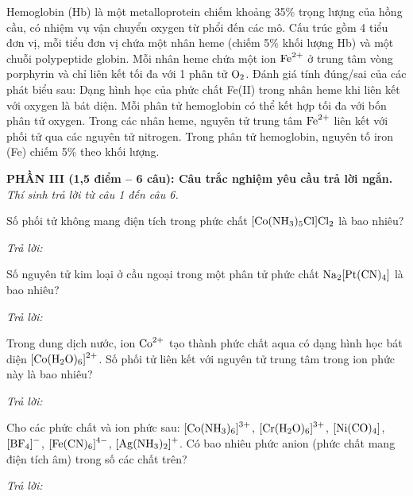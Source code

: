 \documentclass[11pt,a4paper]{article}
\def\loigiai#1{}
\begin{document}
\begin{ex}
Hemoglobin (Hb) là một metalloprotein chiếm khoảng 35\% trọng lượng của hồng cầu, có nhiệm vụ vận chuyển oxygen từ phổi đến các mô. Cấu trúc gồm 4 tiểu đơn vị, mỗi tiểu đơn vị chứa một nhân heme (chiếm 5\% khối lượng Hb) và một chuỗi polypeptide globin. Mỗi nhân heme chứa một ion $\ce{Fe^2+}$ ở trung tâm vòng porphyrin và chỉ liên kết tối đa với 1 phân tử $\ce{O2}$. Đánh giá tính đúng/sai của các phát biểu sau:
\choiceTF
{Dạng hình học của phức chất Fe(II) trong nhân heme khi liên kết với oxygen là bát diện.}
{Mỗi phân tử hemoglobin có thể kết hợp tối đa với bốn phân tử oxygen.}
{Trong các nhân heme, nguyên tử trung tâm $\ce{Fe^2+}$ liên kết với phối tử qua các nguyên tử nitrogen.}
{Trong phân tử hemoglobin, nguyên tố iron (Fe) chiếm 5\% theo khối lượng.}
\loigiai{}
\end{ex}

\newpage

\noindent
\textbf{PHẦN III (1,5 điểm -- 6 câu): Câu trắc nghiệm yêu cầu trả lời ngắn.}\\
\textit{Thí sinh trả lời từ câu 1 đến câu 6.}

\setcounter{ex}{0}

\begin{ex}
Số phối tử không mang điện tích trong phức chất $\ce{[Co(NH3)5Cl]Cl2}$ là bao nhiêu?
\loigiai{}
\end{ex}
\noindent\textit{Trả lời:} \dotfill
\vspace{0.2cm}

\begin{ex}
Số nguyên tử kim loại ở cầu ngoại trong một phân tử phức chất $\ce{Na2[Pt(CN)4]}$ là bao nhiêu?
\loigiai{}
\end{ex}
\noindent\textit{Trả lời:} \dotfill
\vspace{0.2cm}

\begin{ex}
Trong dung dịch nước, ion $\ce{Co^2+}$ tạo thành phức chất aqua có dạng hình học bát diện $\ce{[Co(H2O)6]^2+}$. Số phối tử liên kết với nguyên tử trung tâm trong ion phức này là bao nhiêu?
\loigiai{}
\end{ex}
\noindent\textit{Trả lời:} \dotfill
\vspace{0.2cm}

\begin{ex}
Cho các phức chất và ion phức sau: $\ce{[Co(NH3)6]^3+}$, $\ce{[Cr(H2O)6]^3+}$, $\ce{[Ni(CO)4]}$, $\ce{[BF4]-}$, $\ce{[Fe(CN)6]^4-}$, $\ce{[Ag(NH3)2]+}$. Có bao nhiêu phức anion (phức chất mang điện tích âm) trong số các chất trên?
\loigiai{}
\end{ex}
\noindent\textit{Trả lời:} \dotfill
\vspace{0.2cm}
\end{document}
